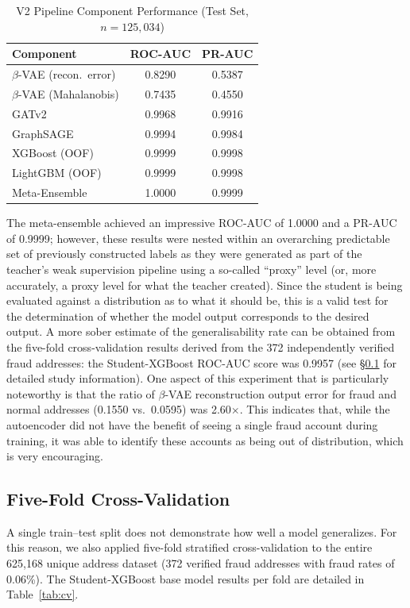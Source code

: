 \documentclass[journal]{IEEEtran}
\begin{document}
\begin{table}[!t]
\centering
\caption{V2 Pipeline Component Performance (Test Set, $n = 125{,}034$)}
\label{tab:v2perf}
\begin{tabular}{lcc}
\toprule
\textbf{Component} & \textbf{ROC-AUC} & \textbf{PR-AUC} \\
\midrule
$\beta$-VAE (recon.\ error) & 0.8290 & 0.5387 \\
$\beta$-VAE (Mahalanobis) & 0.7435 & 0.4550 \\
GATv2 & 0.9968 & 0.9916 \\
GraphSAGE & 0.9994 & 0.9984 \\
XGBoost (OOF) & 0.9999 & 0.9998 \\
LightGBM (OOF) & 0.9999 & 0.9998 \\
Meta-Ensemble & 1.0000 & 0.9999 \\
\bottomrule
\end{tabular}
\end{table}

The meta-ensemble achieved an impressive ROC-AUC of 1.0000 and a PR-AUC of 0.9999; however, these results were nested within an overarching predictable set of previously constructed labels as they were generated as part of the teacher's weak supervision pipeline using a so-called ``proxy'' level (or, more accurately, a proxy level for what the teacher created). Since the student is being evaluated against a distribution as to what it should be, this is a valid test for the determination of whether the model output corresponds to the desired output. A more sober estimate of the generalisability rate can be obtained from the five-fold cross-validation results derived from the 372 independently verified fraud addresses: the Student-XGBoost ROC-AUC score was 0.9957 (see \S\ref{sec:crossval} for detailed study information). One aspect of this experiment that is particularly noteworthy is that the ratio of $\beta$-VAE reconstruction output error for fraud and normal addresses (0.1550 vs.\ 0.0595) was 2.60$\times$. This indicates that, while the autoencoder did not have the benefit of seeing a single fraud account during training, it was able to identify these accounts as being out of distribution, which is very encouraging.

\subsection{Five-Fold Cross-Validation}
\label{sec:crossval}

A single train--test split does not demonstrate how well a model generalizes. For this reason, we also applied five-fold stratified cross-validation to the entire 625,168 unique address dataset (372 verified fraud addresses with fraud rates of 0.06\%). The Student-XGBoost base model results per fold are detailed in Table~\ref{tab:cv}.
\end{document}
